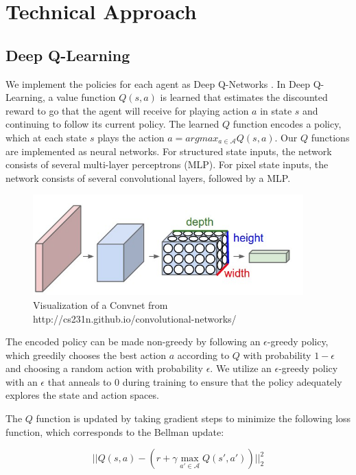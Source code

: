 \documentclass[10pt,twocolumn,letterpaper]{article}
\begin{document}
\section{Technical Approach}
\label{technical}
\subsection{Deep Q-Learning}

We implement the policies for each agent as Deep Q-Networks \citep{nature2013}.
In Deep Q-Learning, a value function $Q(s, a)$ is learned that estimates the
discounted reward to go that the agent will receive for playing action $a$ in
state $s$ and continuing to follow its current policy. The learned $Q$ function
encodes a policy, which at each state $s$ plays the action $a = argmax_{a \in
\mathcal{A}}Q(s, a)$. Our $Q$ functions are implemented as neural networks. For
structured state inputs, the network consists of several multi-layer perceptrons
(MLP). For pixel state inputs, the network consists of several convolutional
layers, followed by a MLP.

\begin{figure}[H]
\center
\includegraphics[width=\columnwidth]{convnet}
\caption{
Visualization of a Convnet from http://cs231n.github.io/convolutional-networks/
}\label{fig:results}
\end{figure}

The encoded policy can be made non-greedy by
following an $\epsilon$-greedy policy, which greedily chooses the best action
$a$ according to $Q$ with probability $1 - \epsilon$ and choosing a random
action with probability $\epsilon$. We utilize an $\epsilon$-greedy policy with
an $\epsilon$ that anneals to $0$ during training to ensure that the policy
adequately explores the state and action spaces.

The $Q$ function is updated by taking gradient steps to minimize the
following loss function, which corresponds to the Bellman update:

\begin{equation}
  ||Q(s, a) - (r + \gamma \max_{a' \in \mathcal{A}}Q(s', a'))||^2_2
\end{equation}
\end{document}
